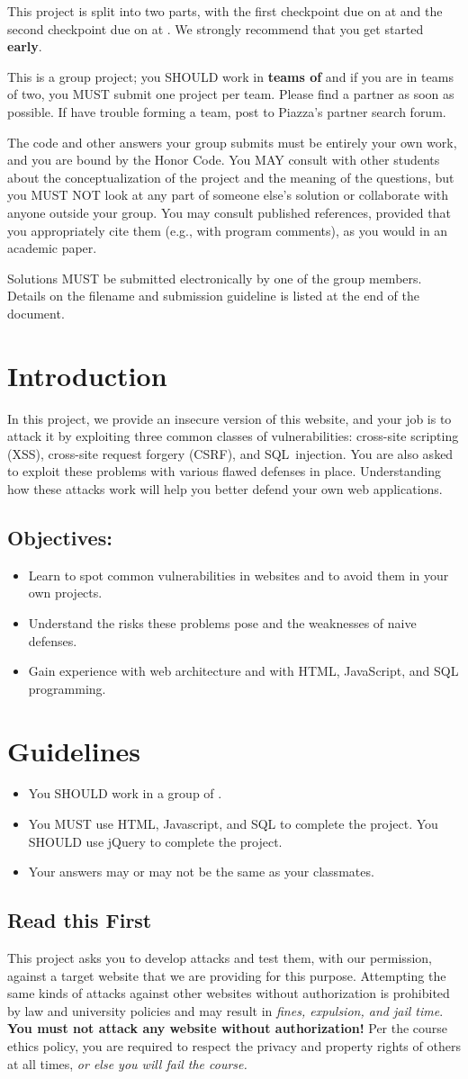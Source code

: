 \documentclass[letterpaper,12pt]{report}
\newcommand{\htitle}
{
     \noindent\parbox{\textwidth}
    {
        \course\hfill \distdate\newline
        \coursename\hfill 
        \settitle \vspace*{-.5ex}\newline
        \mbox{}\hrulefill\mbox{}
    }
    \vspace{8pt}
    \begin{center}{\Large\bf{\settitle}}\end{center}
}
\newcommand{\handout}
{
    \thispagestyle{empty}
    \markboth{}{}
    \pagestyle{plain}
    \htitle
}
\newcommand{\problemsetheader}
{
\setlength{\parindent}{0pt}

This project is split into two parts, with the first checkpoint due on {\bf \checkpointduedate} at {\bf \duetime} and the second checkpoint due on {\bf \duedate} at {\bf \duetime}. We strongly recommend that you get started {\bf early}. 
\medskip

This is a group project; you SHOULD work in \textbf{teams of \numberingroup} and if you are in teams of two, you MUST submit one project per team.  Please find a partner as soon as possible.  If have trouble forming a team, post to Piazza's partner search forum.

\medskip

The code and other answers your group submits must be entirely your own work, and you are bound by the Honor Code.  You MAY consult with other students about the conceptualization of the project and the meaning of the questions, but you MUST NOT look at any part of someone else's solution or collaborate with anyone outside your group.  You may consult published references, provided that you appropriately cite them (e.g., with program comments), as you would in an academic paper.

\medskip

Solutions MUST be submitted electronically by one of the group members. Details on the filename and submission guideline is listed at the end of the document.

\medskip

\hrulefill

\medskip

}
\begin{document}
\handout
\problemsetheader


\vspace{-6pt}
\section*{Introduction}
In this project, we provide an insecure version of this website, and your job is to attack it by exploiting three common classes of vulnerabilities: cross-site scripting (XSS), cross-site request forgery (CSRF), and SQL~injection. You are also asked to exploit these problems with various flawed defenses in place. Understanding how these attacks work will help you better defend your own web applications.\newline

\subsection*{Objectives:}

\begin{itemize}
\item Learn to spot common vulnerabilities in websites and to avoid them in your own projects.
\item Understand the risks these problems pose and the weaknesses of naive defenses.
\item Gain experience with web architecture and with HTML, JavaScript, and SQL programming.
\end{itemize}

\section*{Guidelines}
\begin{itemize}
\item You SHOULD work in a group of \numberingroup.
\item You MUST use HTML, Javascript, and SQL to complete the project. You SHOULD use jQuery to complete the project.
\item Your answers may or may not be the same as your classmates.
\end{itemize}

\smallskip

\subsection*{Read this First}

This project asks you to develop attacks and test them, with our permission, against a target website that we are providing for this purpose.  Attempting the same kinds of attacks against other websites without authorization is prohibited by law and university policies and may result in \emph{fines, expulsion, and jail time}.   \textbf{You must not attack any website without authorization!}  Per the course ethics policy, you are required to respect the privacy and  property rights of others at all times, \emph{or else you will fail the course.}  
\end{document}
